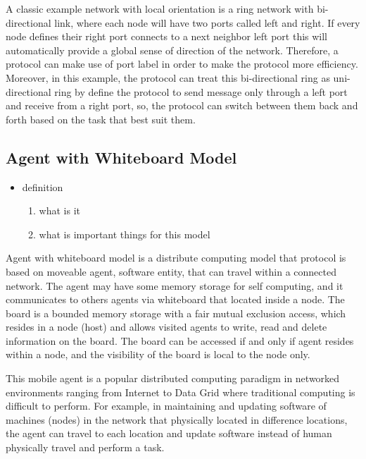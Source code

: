 A classic example network with local orientation is a ring network with bi-directional link, where each node will have two ports called left and right. If every node defines their right port connects to a next neighbor left port this will automatically provide a global sense of direction of the network. Therefore, a protocol can make use of port label in order to make the protocol more efficiency. Moreover, in this example, the protocol can treat this bi-directional ring as uni-directional ring by define the protocol to send message only through a left port and receive from a right port, so, the protocol can switch between them back and forth based on the task that best suit them.




\subsection{Agent with Whiteboard Model}

\begin{itemize}
\item definition
    \begin{enumerate}
    \item what is it
    \item what is important things for this model
    \end{enumerate}
\end{itemize}


Agent with whiteboard model is a distribute computing model that protocol is based on moveable agent, software entity, that can travel within a connected network. The agent may have some memory storage for self computing, and it communicates to others agents via whiteboard that located inside a node. The board is a bounded memory storage with a fair mutual exclusion access, which resides in a node (host) and allows visited agents to write, read and delete information on the board. The board can be accessed if and only if agent resides within a node, and the visibility of the board is local to the node only.

This mobile agent is a popular distributed computing paradigm in networked environments ranging from Internet to Data Grid where traditional computing is difficult to perform. For example, in maintaining and updating software of machines (nodes) in the network that physically located in difference locations, the agent can travel to each location and update software instead of human physically travel and perform a task.

